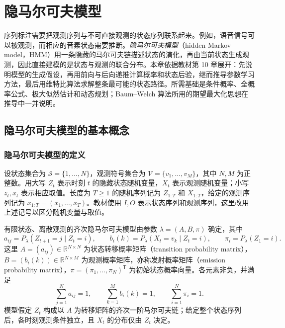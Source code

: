 \setcounter{chapter}{9} %
\chapter{隐马尔可夫模型}
\label{chap:lh-hmm}

序列标注需要把观测序列与不可直接观测的状态序列联系起来。例如，语音信号可以被观测，而相应的音素状态需要推断。\emph{隐马尔可夫模型}（hidden Markov model，HMM）用一条隐藏的马尔可夫链描述状态的演化，再由当前状态生成观测，因此直接建模的是状态与观测的联合分布。本章依据教材第 10 章展开：先说明模型的生成假设，再用前向与后向递推计算概率和状态后验，继而推导参数学习方法，最后用维特比算法求解整条最可能的状态路径。所需基础是条件概率、全概率公式、极大似然估计和动态规划；Baum--Welch 算法所用的期望最大化思想在推导中一并说明。

\section{隐马尔可夫模型的基本概念}
\label{sec:lh-hmm-model}

\subsection{隐马尔可夫模型的定义}

设状态集合为 $\mathcal S=\{1,\ldots,N\}$，观测符号集合为 $\mathcal V=\{v_1,\ldots,v_M\}$，其中 $N,M$ 为正整数。用大写 $Z_t$ 表示时刻 $t$ 的隐藏状态随机变量，$X_t$ 表示观测随机变量；小写 $z_t,x_t$ 表示相应取值。长度为 $T\geq1$ 的随机序列记为 $Z_{1:T}$ 和 $X_{1:T}$，给定的观测序列记为 $x_{1:T}=(x_1,\ldots,x_T)$。教材使用 $I,O$ 表示状态序列和观测序列，这里改用上述记号以区分随机变量与取值。

\begin{definition}
\label{def:lh-hmm}
有限状态、离散观测的齐次隐马尔可夫模型由参数 $\lambda=(A,B,\pi)$ 确定，其中
\begin{equation}
\label{eq:lh-hmm-parameters}
 a_{ij}=P_\lambda(Z_{t+1}=j\mid Z_t=i),\qquad
 b_i(k)=P_\lambda(X_t=v_k\mid Z_t=i),\qquad
 \pi_i=P_\lambda(Z_1=i).
\end{equation}
这里 $A=(a_{ij})\in\mathbb R^{N\times N}$ 为状态转移概率矩阵（transition probability matrix），$B=(b_i(k))\in\mathbb R^{N\times M}$ 为观测概率矩阵，亦称发射概率矩阵（emission probability matrix），$\pi=(\pi_1,\ldots,\pi_N)^{\mathsf T}$ 为初始状态概率向量。各元素非负，并满足
\[
 \sum_{j=1}^N a_{ij}=1,\qquad
 \sum_{k=1}^M b_i(k)=1,\qquad
 \sum_{i=1}^N\pi_i=1.
\]
模型假定 $Z_t$ 构成以 $A$ 为转移矩阵的齐次一阶马尔可夫链；给定整个状态序列后，各时刻观测条件独立，且 $X_t$ 的分布仅由 $Z_t$ 决定。
\end{definition}

